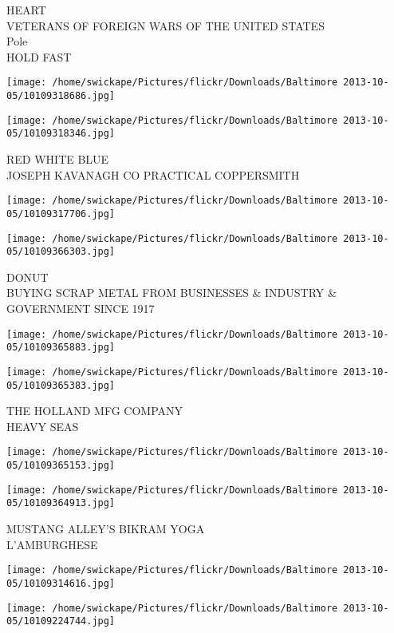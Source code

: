\documentclass[10pt,letterpaper]{article}
\begin{document}
HEART\\
VETERANS OF FOREIGN WARS OF THE UNITED STATES\\
Pole\\
HOLD FAST
\pagebreak

\texttt{[image: /home/swickape/Pictures/flickr/Downloads/Baltimore 2013-10-05/10109318686.jpg]}

\vspace{0.25in}
\texttt{[image: /home/swickape/Pictures/flickr/Downloads/Baltimore 2013-10-05/10109318346.jpg]}

RED WHITE BLUE\\
JOSEPH KAVANAGH CO PRACTICAL COPPERSMITH
\pagebreak

\texttt{[image: /home/swickape/Pictures/flickr/Downloads/Baltimore 2013-10-05/10109317706.jpg]}

\vspace{0.25in}
\texttt{[image: /home/swickape/Pictures/flickr/Downloads/Baltimore 2013-10-05/10109366303.jpg]}

DONUT\\
BUYING SCRAP METAL FROM BUSINESSES \& INDUSTRY \& GOVERNMENT SINCE 1917
\pagebreak

\texttt{[image: /home/swickape/Pictures/flickr/Downloads/Baltimore 2013-10-05/10109365883.jpg]}

\vspace{0.25in}
\texttt{[image: /home/swickape/Pictures/flickr/Downloads/Baltimore 2013-10-05/10109365383.jpg]}

THE HOLLAND MFG COMPANY\\
HEAVY SEAS
\pagebreak

\texttt{[image: /home/swickape/Pictures/flickr/Downloads/Baltimore 2013-10-05/10109365153.jpg]}

\vspace{0.25in}
\texttt{[image: /home/swickape/Pictures/flickr/Downloads/Baltimore 2013-10-05/10109364913.jpg]}

MUSTANG ALLEY'S BIKRAM YOGA\\
L'AMBURGHESE
\pagebreak

\texttt{[image: /home/swickape/Pictures/flickr/Downloads/Baltimore 2013-10-05/10109314616.jpg]}

\vspace{0.25in}
\texttt{[image: /home/swickape/Pictures/flickr/Downloads/Baltimore 2013-10-05/10109224744.jpg]}
\end{document}
